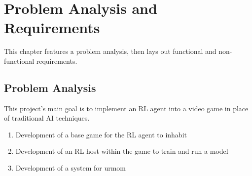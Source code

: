 \chapter{Problem Analysis and Requirements}

This chapter features a problem analysis, then lays out functional and non-functional requirements.

\section{Problem Analysis}

This project's main goal is to implement an RL agent into a video game in place of traditional AI techniques.

\begin{enumerate}
    \item Development of a base game for the RL agent to inhabit
    \item Development of an RL host within the game to train and run a model
    \item Development of a system for urmom
\end{enumerate}